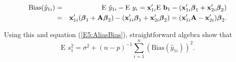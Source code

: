 \begin{center}
\begin{eqnarray*}
\text{Bias}(\hat{y}_{1i}) &=&\text{E }\hat{y}_{1i}-\text{E }y_{i}=\mathbf{x}%
_{1i}^{\prime }\text{E }\mathbf{b}_{1}-\left( \mathbf{x}_{1i}^{\prime }%
\boldsymbol \beta_{1}+\mathbf{x}_{2i}^{\prime } \boldsymbol \beta_{2}\right)  \\
&=&\mathbf{x}_{1i}^{\prime }(\boldsymbol \beta_{1}+\mathbf{A \boldsymbol \beta }%
_{2})-\left( \mathbf{x}_{1i}^{\prime }\boldsymbol \beta_{1}+\mathbf{x}%
_{2i}^{\prime }\boldsymbol \beta_{2}\right) =(\mathbf{x}_{1i}^{\prime }\mathbf{%
A}-\mathbf{x}_{2i}^{\prime })\boldsymbol \beta_{2}.
\end{eqnarray*}
\end{center}

Using this and equation (\ref{E5:AliasBias}), straightforward
algebra show that
\begin{equation}\label{E5:SumBias}
\text{E }s_{1}^{2}=\sigma ^{2}+(n-p)^{-1}\sum_{i=1}^{n}(\text{Bias}(\hat{y}%
_{1i}))^{2}.
\end{equation}


